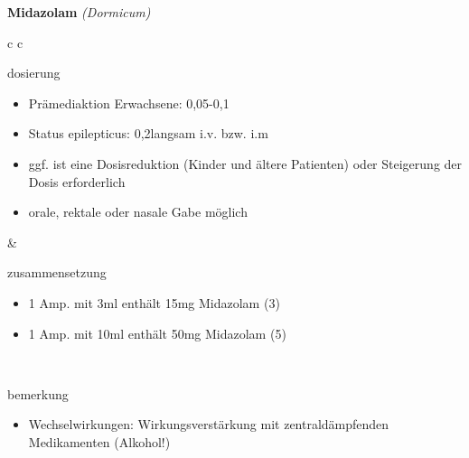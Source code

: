 \begin{frame}{
    \textbf{Midazolam}
    \textit{(Dormicum)}
}
    \begin{tabular}{c c}
        \begin{beamercolorbox}[wd=\boxwidth\textwidth,ht=\boxheight\textheight,sep=1em]{dosierung}
            \begin{itemize}
                \item Prämediaktion Erwachsene: 0,05-0,1\mgkgkg
                \item Status epilepticus: 0,2\mgkgkg langsam i.v. bzw. i.m
                \item ggf. ist eine Dosisreduktion (Kinder und ältere Patienten) oder Steigerung der Dosis erforderlich
                \item orale, rektale oder nasale Gabe möglich
            \end{itemize}
        \end{beamercolorbox} & 
        \begin{beamercolorbox}[wd=\boxwidth\textwidth,ht=\boxheight\textheight,sep=1em]{zusammensetzung}
            \begin{itemize}
                \item 1 Amp. mit 3ml enthält 15mg Midazolam (3\mgml)
                \item 1 Amp. mit 10ml enthält 50mg Midazolam (5\mgml)
            \end{itemize}
        \end{beamercolorbox} \\
        \begin{beamercolorbox}[wd=\textwidth,ht=\boxheight\textheight,sep=1em]{bemerkung}
            \begin{itemize}
                \item Wechselwirkungen: Wirkungsverstärkung mit zentraldämpfenden Medikamenten (Alkohol!)
            \end{itemize}
        \end{beamercolorbox} \\
    \end{tabular}
\end{frame}

